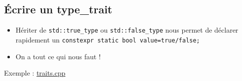 \documentclass{beamer}
\begin{document}
\subsection{Écrire un type\_trait}
\begin{frame}[containsverbatim]
\begin{itemize}
	\item Hériter de \lstinline{std::true_type} ou \lstinline{std::false_type} nous permet de déclarer rapidement un \lstinline{constexpr static bool value=true/false;}
	\item On a tout ce qui nous faut !
\end{itemize}


Exemple : \href{run:../code_demo/traits.cpp}{traits.cpp}\\

\end{frame}
\end{document}
